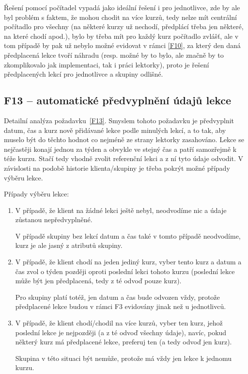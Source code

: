 Řešení pomocí počítadel vypadá jako ideální řešení i pro jednotlivce, zde by ale byl problém s faktem, že mohou chodit na více kurzů, tedy nelze mít centrální počítadlo pro všechny (na některé kurzy už nechodí, předplácí třeba jen některé, na které chodí apod.), bylo by třeba mít pro každý kurz počítadlo zvlášť, ale v tom případě by pak už nebylo možné evidovat v rámci \ref{F10}, za který den daná předplacená lekce tvoří náhradu (resp. možné by to bylo, ale značně by to zkomplikovalo jak implementaci, tak i práci lektorky), proto je řešení předplacených lekcí pro jednotlivce a skupiny odlišné.

\subsection{F13 -- automatické předvyplnění údajů lekce}\label{subsec:F13detail}

Detailní analýza požadavku~\ref{F13}.
Smyslem tohoto požadavku je předvyplnit datum, čas a kurz nově přidávané lekce podle minulých lekcí, a to tak, aby muselo být do těchto hodnot co nejméně ze strany lektorky zasahováno. Lekce se nejčastěji konají jednou za týden a obvykle ve stejný čas a patří samozřejmě k téže kurzu. Stačí tedy vhodně zvolit referenční lekci a z ní tyto údaje odvodit. V závislosti na podobě historie klienta/skupiny je třeba pokrýt možné případy výběru lekce.

Případy výběru lekce:
\begin{enumerate}
    \item V případě, že klient na žádné lekci ještě nebyl, neodvodíme nic a údaje zůstanou nepředvyplněné.
    
    V případě skupiny bez lekcí datum a čas také v tomto případě neodvodíme, kurz je ale jasný z atributů skupiny.
    \item V případě, že klient chodí na jeden jediný kurz, vyber tento kurz a datum a čas zvol o týden později oproti poslední lekci tohoto kurzu (poslední lekce může být jen předplacená, tedy z té odvoď pouze kurz).
    
    Pro skupiny platí totéž, jen datum a čas bude odvozen vždy, protože předplacené lekce budou v rámci F3 evidovány jinak než u jednotlivců.
    \item V případě, že klient chodí/chodil na více kurzů, vyber ten kurz, jehož poslední lekce je nejpozději (a z té odvoď všechny údaje), navíc, pokud některý kurz má předplacené lekce, preferuj ten (a tedy odvoď jen kurz).
    
    Skupina v této situaci být nemůže, protože má vždy jen lekce k jednomu kurzu.
\end{enumerate}

